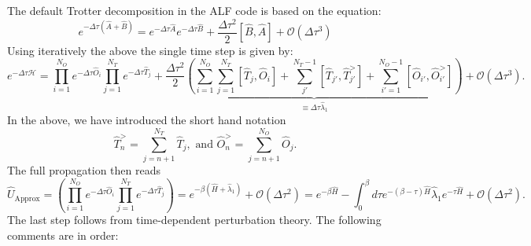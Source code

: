 The default Trotter decomposition in the ALF code is  based on the equation: 
\begin{equation}
	e^{ -\Delta \tau \left( \hat{A} + \hat{B} \right)  }  =  e^{ -\Delta \tau \hat{A}}  e^{ -\Delta \tau  \hat{B}  }   +  \frac{\Delta  \tau^2}{2} \left[ \hat{B}, \hat{A} \right] + \mathcal{O} \left (\Delta \tau ^3 \right) 
\end{equation}
Using   iteratively the above  the single time step is given by: 
\begin{equation}
    e^{-\Delta \tau \mathcal{H}}    =   \prod_{i=1}^{N_O} e^{-\Delta \tau \hat{O}_i} \prod_{j=1}^{N_T} e^{-\Delta \tau \hat{T}_j}  +  \underbrace{ \frac{\Delta \tau^2}{2}  
   \left(    \sum_{i=1}^{N_O}  \sum_{j=1}^{N_T} \left[ \hat{T}_j, \hat{O}_i \right]  +   \sum_{j'}^{N_T -1}  \left[ \hat{T}_{j'},   \hat{T}_{j'}^{>}\right] 
   +   \sum_{i'=1}^{N_O-1}  \left[ \hat{O}_{i'}, \hat{O}^{>}_{i'} \right]  \right)  }_{\equiv \Delta \tau \hat{\lambda}_1}   
   + \mathcal{O} \left( \Delta \tau^3 \right).
\end{equation}
In the above, we have introduced the short hand notation 
\begin{equation}
\hat{T}_{n}^{>} = \sum_{j=n+1}^{N_T}  \hat{T}_{j}, \, \, \text{and} \, \, \hat{O}_{n}^{>} = \sum_{j=n+1}^{N_O}  \hat{O}_{j}.
\end{equation} 
The full propagation then reads
\begin{equation}
  \hat{U}_{\text{Approx}} =  \left(\prod_{i=1}^{N_O} e^{-\Delta \tau \hat{O}_i} \prod_{j=1}^{N_T} e^{-\Delta \tau \hat{T}_j}  \right)   = e^{-\beta \left(  \hat{H} + \hat{\lambda}_1 \right)} 
  + \mathcal{O} \left( \Delta \tau^2 \right)
  =  e^{-\beta  \hat{H}  }  - 
	 \int_0^{\beta}  d \tau  e^{-(\beta-\tau )\hat{H}} \hat{\lambda}_1  e^{-\tau \hat{H}}   +  \mathcal{O} (\Delta \tau^2 ).
\end{equation}
The last step follows from time-dependent perturbation theory. 
The following comments are in order:
